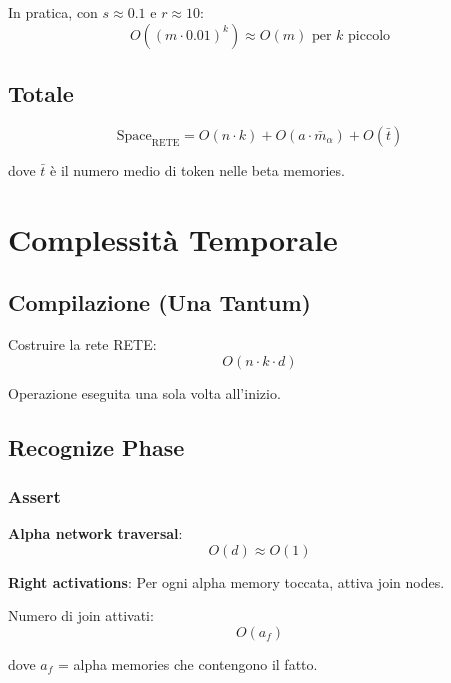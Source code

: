 In pratica, con $s \approx 0.1$ e $r \approx 10$:
\begin{equation}
O((m \cdot 0.01)^k) \approx O(m) \text{ per } k \text{ piccolo}
\end{equation}

\subsection{Totale}

\begin{equation}
\text{Space}_{\text{RETE}} = O(n \cdot k) + O(a \cdot \bar{m}_\alpha) + O(\bar{t})
\end{equation}

dove $\bar{t}$ è il numero medio di token nelle beta memories.

\section{Complessità Temporale}

\subsection{Compilazione (Una Tantum)}

Costruire la rete RETE:
\begin{equation}
O(n \cdot k \cdot d)
\end{equation}

Operazione eseguita una sola volta all'inizio.

\subsection{Recognize Phase}

\subsubsection{Assert}

\textbf{Alpha network traversal}:
\begin{equation}
O(d) \approx O(1)
\end{equation}

\textbf{Right activations}: Per ogni alpha memory toccata, attiva join nodes.

Numero di join attivati:
\begin{equation}
O(a_f)
\end{equation}

dove $a_f$ = alpha memories che contengono il fatto.

